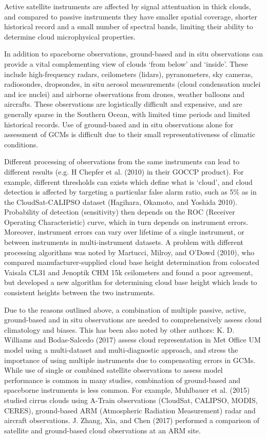 Active satellite instruments are affected by signal attentuation in
thick clouds, and compared to passive instruments they have smaller
spatial coverage, shorter historical record and a small number of
spectral bands, limiting their ability to determine cloud microphysical
properties.

In addition to spaceborne observations, ground-based and in situ
observations can provide a vital complementing view of clouds `from
below' and `inside'. These include high-frequency radars, ceilometers
(lidars), pyranometers, sky cameras, radiosondes, dropsondes, in situ
aerosol measurements (cloud condensation nuclei and ice nuclei) and
airborne observations from drones, weather balloons and aircrafts. These
observations are logistically difficult and expensive, and are generally
sparse in the Southern Ocean, with limited time periods and limited
historical records. Use of ground-based and in situ observations alone
for assessment of GCMs is difficult due to their small
representativeness of climatic conditions.

Different processing of observations from the same instruments can lead
to different results (e.g. H Chepfer et al. (2010) in their GOCCP
product). For example, different thresholds can exists which define what
is `cloud', and cloud detection is affected by targeting a particular
false alarm ratio, such as 5\% as in the CloudSat-CALIPSO dataset
(Hagihara, Okamoto, and Yoshida 2010). Probability of detection
(sensitivity) then depends on the ROC (Receiver Operating
Characteristic) curve, which in turn depends on instrument errors.
Moreover, instrument errors can vary over lifetime of a single
instrument, or between instruments in multi-instrument datasets. A
problem with different processing algorithms was noted by Martucci,
Milroy, and O'Dowd (2010), who compared manufacturer-supplied cloud base
height determination from colocated Vaisala CL31 and Jenoptik CHM 15k
ceilometers and found a poor agreement, but developed a new algorithm
for determining cloud base height which leads to consistent heights
between the two instruments.

Due to the reasons outlined above, a combination of multiple passive,
active, ground-based and in situ observations are needed to
comprehensively assess cloud climatology and biases. This has been also
noted by other authors: K. D. Williams and Bodas-Salcedo (2017) assess
cloud representation in Met Office UM model using a multi-dataset and
multi-diagnostic approach, and stress the importance of using multiple
instruments due to compensating errors in GCMs. While use of single or
combined satellite observations to assess model performance is common in
many studies, combination of ground-based and spaceborne instruments is
less common. For example, Muhlbauer et al. (2015) studied cirrus clouds
using A-Train observations (CloudSat, CALIPSO, MODIS, CERES),
ground-based ARM (Atmospheric Radiation Measurement) radar and aircraft
observations. J. Zhang, Xia, and Chen (2017) performed a comparison of
satellite and ground-based cloud observations at an ARM site.


